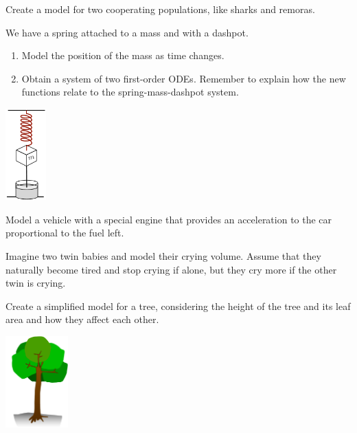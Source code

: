 \begin{exercises}

	\begin{problist}
	
	\prob Create a model for two cooperating populations, like sharks and remoras. 
	
	
	
	
	\begin{minipage}{.35\textwidth}
		\prob We have a spring attached to a mass and with a dashpot. 
		\begin{enumerate}
			\item Model the position of the mass as time changes.
			\item Obtain a system of two first-order ODEs. Remember to explain how the new functions relate to the spring-mass-dashpot system.
		\end{enumerate}
	\end{minipage}
	\hfill
	\begin{minipage}{100pt}
		\includegraphics*[height=100pt]{images/module15-spring-mass-dashpot.pdf}
	\end{minipage}

	\prob Model a vehicle with a special engine that provides an acceleration to the car proportional to the fuel left.
	
	\prob Imagine two twin babies and model their crying volume. Assume that they naturally become tired and stop crying if alone, but they cry more if the other twin is crying.
	
	
	
	\begin{minipage}{.35\textwidth}
		\prob Create a simplified model for a tree, considering the height of the tree and its leaf area and how they affect each other.	
	\end{minipage}
	\hfill
	\begin{minipage}{100pt}
		\includegraphics*[height=100pt]{images/module15-tree.pdf}
	\end{minipage}


\end{problist}
\end{exercises}
